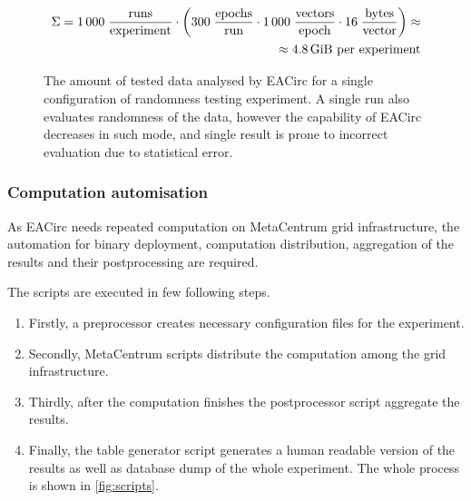 \documentclass[
  print, %
  Table,   %
  nolof,     %
  nolot,     %
  11pt, %
  oneside  %
]{fithesis3}
\begin{document}
\begin{figure}[t]
    \begin{equation*}
        \begin{aligned}
    \Sigma = 1\,000 \;
             \frac{\textnormal{runs}}
                  {\textnormal{experiment}}
             \cdot
             \left(
             300 \;
             \frac{\textnormal{epochs}}
                  {\textnormal{run}}
             \cdot
             1\,000 \;
             \frac{\textnormal{vectors}}
                  {\textnormal{epoch}}
             \cdot
             16 \;
             \frac{\textnormal{bytes}}
                  {\textnormal{vector}}
             \right) \approx\\
             \approx 4.8 \textnormal{\,GiB per experiment}
        \end{aligned}
    \end{equation*}
    \caption{The amount of tested data analysed by EACirc for a single configuration of randomness testing experiment. A single run also evaluates randomness of the data, however the capability of EACirc decreases in such mode, and single result is prone to incorrect evaluation due to statistical error.}
    \label{fig:dataUsage}
\end{figure}


\subsubsection{\textbf{Computation automisation}}
\label{subsubsec:method-spec-ss-auto}

As EACirc needs repeated computation on MetaCentrum grid infrastructure, the automation for binary deployment, computation distribution, aggregation of the results and their postprocessing are required.

The scripts are executed in few following steps.

\begin{enumerate}[noitemsep,topsep=3pt,parsep=3pt,partopsep=3pt]
 \item Firstly, a preprocessor creates necessary configuration files for the experiment.
 \item Secondly, MetaCentrum scripts distribute the computation among the grid infrastructure.
 \item Thirdly, after the computation finishes the postprocessor script aggregate the results. 
 \item Finally, the table generator script generates a human readable version of the results as well as database dump of the whole experiment. The whole process is shown in \cref{fig:scripts}.
\end{enumerate}
\end{document}
